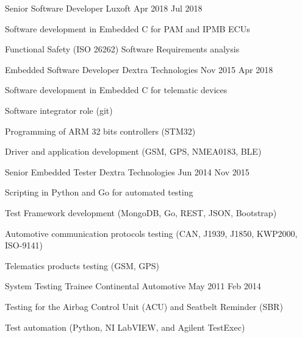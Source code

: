 \documentclass[10pt, letterpaper]{article} %
\begin{document}

\job
{Senior Software Developer}
{Luxoft}
{Apr 2018}
{Jul 2018}
{
\begin{itemize-bullets}
\item{Software development in Embedded C for PAM and IPMB ECUs}
\item{Functional Safety (ISO 26262) Software Requirements analysis}
\end{itemize-bullets}
}


\job
{Embedded Software Developer}
{Dextra Technologies}
{Nov 2015}
{Apr 2018}
{
\begin{itemize-bullets}
\item{Software development in Embedded C for telematic devices}
\item{Software integrator role (git)}
\item{Programming of ARM 32 bits controllers (STM32)}
\item{Driver and application development (GSM, GPS, NMEA0183, BLE)}
\end{itemize-bullets}
}


\job
{Senior Embedded Tester}
{Dextra Technologies}
{Jun 2014}
{Nov 2015}
{
\begin{itemize-bullets}
\item{Scripting in Python and Go for automated testing }
\item{Test Framework development (MongoDB, Go, REST, JSON, Bootstrap)}
\item{Automotive communication protocols testing (CAN, J1939, J1850, KWP2000, ISO-9141)}
\item{Telematics products testing (GSM, GPS)}
\end{itemize-bullets}
}



\job
{System Testing Trainee}
{Continental Automotive}
{May 2011}
{Feb 2014}
{
\begin{itemize-bullets}
\item{Testing for the Airbag Control Unit (ACU) and Seatbelt Reminder (SBR)}
\item{Test automation (Python, NI LabVIEW, and Agilent TestExec)}
\end{itemize-bullets}
}
\end{document}
